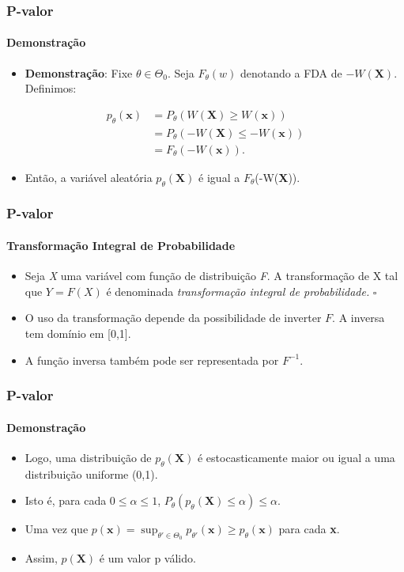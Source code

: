 \begin{frame}[c] 
\frametitle{P-valor} 
\framesubtitle{Demonstração}
\begin{itemize}
    \justifying
    \item \textbf{Demonstração}: Fixe $\theta \in \Theta_{0}$. Seja $F_\theta(w)$ denotando a FDA de $-W(\textbf{X})$. Definimos:
\end{itemize}
\begin{align}
    p_{ \theta }(\textbf{x}) &=P_{ \theta }(W(\textbf{X}) \geq W(\textbf{x})) \nonumber \\
    &=P_{\theta}(-W(\textbf{X}) \leq -W(\textbf{x})) \nonumber \\
    &= F_{ \theta }(-W(\textbf{x})).
\end{align}
\begin{itemize}
    \item Então, a variável aleatória $p_{\theta}(\textbf{X})$ é igual a $F_{\theta}$(-W(\textbf{X})).
\end{itemize}
\end{frame}

\begin{frame}[c]
\frametitle{P-valor} 
\framesubtitle{Transformação Integral de Probabilidade}
\begin{itemize}
    \justifying
    \item Seja \textit{X} uma variável com função de distribuição \textit{F}. A transformação de X tal que $Y=F(X)$ é denominada \textit{transformação integral de probabilidade.} \cite{marco} \hfill $\square$
    \item O uso da transformação depende da possibilidade de inverter $F$. A inversa tem domínio em [0,1].
    \item A função inversa também pode ser representada por $F^{-1}$.
\end{itemize}
\end{frame}

\begin{frame}[c] 
\frametitle{P-valor} 
\framesubtitle{Demonstração}
\begin{itemize}
    \justifying
    \item Logo, uma distribuição de $p_{\theta}(\textbf{X})$ é estocasticamente maior ou igual a uma distribuição uniforme (0,1). 
    \item Isto é, para cada $0 \leq \alpha \leq 1$, $P_{ \theta } (p_{ \theta }(\textbf{X})  \leq  \alpha ) \leq  \alpha$.
    \item Uma vez que $p(\textbf{x}) = \sup_{\theta' \in \Theta_{0}} p_{\theta'}(\textbf{x}) \geq p_{\theta}(\textbf{x})$ para cada \textbf{x}.
    \item Assim, $p(\textbf{X})$ é um valor p válido.
\end{itemize}
\end{frame}

